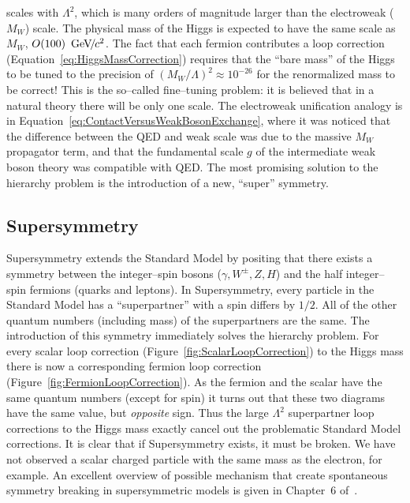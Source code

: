 scales with $\Lambda^2$, which is many orders of magnitude larger than the
electroweak ($M_W$) scale.  The physical mass of the Higgs is expected to have
the same scale as $M_W$, $O(100)~{\,\text{Ge\hspace{-.08em}V\hspace{-0.16em}/\hspace{-0.08em}}c^\text{2}}$.  The fact that each fermion
contributes a loop correction (Equation~\ref{eq:HiggsMassCorrection}) requires
that the ``bare mass'' of the Higgs to be tuned to the precision of
$(M_W/\Lambda)^2 \approx 10^{-26}$ for the renormalized mass to be correct!
This is the so--called fine--tuning problem: it is believed that in a natural
theory there will be only one scale.  The electroweak unification analogy is in
Equation~\ref{eq:ContactVersusWeakBosonExchange}, where it was noticed that the
difference between the QED and weak scale was due to the massive $M_W$
propagator term, and that the fundamental scale $g$ of the intermediate weak
boson theory was compatible with QED\@.  The most promising solution to the
hierarchy problem is the introduction of a new, ``super'' symmetry.

\subsection{Supersymmetry}
Supersymmetry extends the Standard Model by positing that there exists a
symmetry between the integer--spin bosons ($\gamma, W^\pm, Z, H$) and the half
integer--spin fermions (quarks and leptons).  In Supersymmetry, every particle
in the Standard Model has a ``superpartner'' with a spin differs by $1/2$.  All
of the other quantum numbers (including mass) of the superpartners are the same.
The introduction of this symmetry immediately solves the hierarchy problem.  For
every scalar loop correction (Figure~\ref{fig:ScalarLoopCorrection}) to the
Higgs mass there is now a corresponding fermion loop correction
(Figure~\ref{fig:FermionLoopCorrection}).  As the fermion and the scalar have
the same quantum numbers (except for spin) it turns out that these two diagrams
have the same value, but \emph{opposite} sign.  Thus the large $\Lambda^2$
superpartner loop corrections to the Higgs mass exactly cancel out the
problematic Standard Model corrections.  It is clear that if Supersymmetry
exists, it must be broken.  We have not observed a scalar charged particle with
the same mass as the electron, for example.  An excellent overview of possible
mechanism that create spontaneous symmetry breaking in supersymmetric models is
given in Chapter~6 of~\cite{Martin:1997um}.

